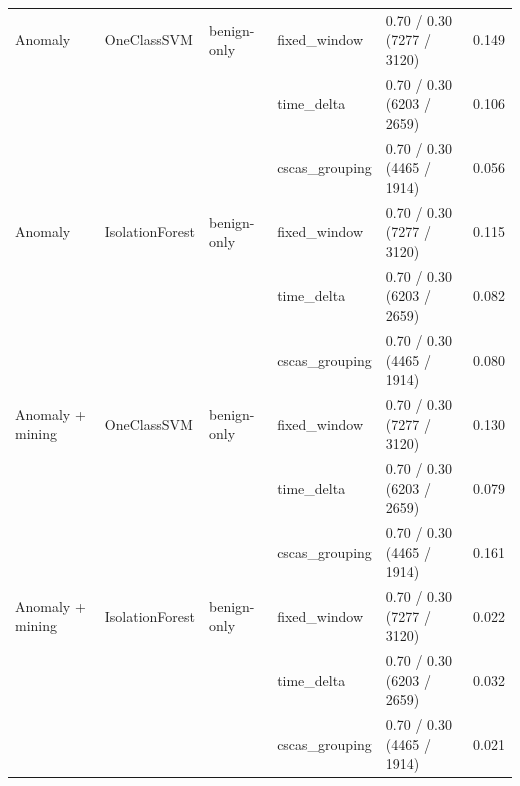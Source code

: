 \begin{table}[htbp]
{\begin{tabular}{lllllc}
Anomaly & OneClassSVM & benign-only & fixed\_window & 0.70 / 0.30 (7277 / 3120) & 0.149 \\
 &  &  & time\_delta & 0.70 / 0.30 (6203 / 2659) & 0.106 \\
 &  &  & cscas\_grouping & 0.70 / 0.30 (4465 / 1914) & 0.056 \\
\addlinespace
Anomaly & IsolationForest & benign-only & fixed\_window & 0.70 / 0.30 (7277 / 3120) & 0.115 \\
 &  &  & time\_delta & 0.70 / 0.30 (6203 / 2659) & 0.082 \\
 &  &  & cscas\_grouping & 0.70 / 0.30 (4465 / 1914) & 0.080 \\
\addlinespace
Anomaly + mining & OneClassSVM & benign-only & fixed\_window & 0.70 / 0.30 (7277 / 3120) & 0.130 \\
 &  &  & time\_delta & 0.70 / 0.30 (6203 / 2659) & 0.079 \\
 &  &  & cscas\_grouping & 0.70 / 0.30 (4465 / 1914) & 0.161 \\
\addlinespace
Anomaly + mining & IsolationForest & benign-only & fixed\_window & 0.70 / 0.30 (7277 / 3120) & 0.022 \\
 &  &  & time\_delta & 0.70 / 0.30 (6203 / 2659) & 0.032 \\
 &  &  & cscas\_grouping & 0.70 / 0.30 (4465 / 1914) & 0.021 \\
\bottomrule
\end{tabular}%
}
\end{table}

